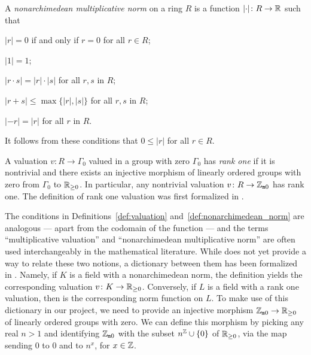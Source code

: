 \documentclass[sigplan,10pt, nonacm, review]{acmart}
\begin{document}
\begin{definition}\label{def:nonarchimedean_norm}
A \emph{nonarchimedean multiplicative norm} on a ring $R$ is a function $\lvert\cdot\rvert \colon R \to \mathbb{R}$
such that
\begin{listDef}
\item $\lvert r\rvert = 0$ if and only if $r = 0$ for all $r \in R$;
\item $\lvert 1\rvert = 1$;
\item $\lvert r\cdot s\rvert  = \lvert r\rvert \cdot \lvert s\rvert $ for all $r, s$ in $R$;
\item $\lvert r + s\rvert \leq \max \{\lvert r\rvert, \lvert s\rvert \}$ for all $r, s$ in $R$;
\item $\lvert -r\rvert = \lvert r\rvert$ for all $r$ in $R$.
\end{listDef}
It follows from these conditions that $0 \le \lvert r\rvert$ for all $r \in R$.
\end{definition}
A valuation $v \colon R \to \Gamma_0$ valued in a group with zero $\Gamma_0$ has \emph{rank one} if it is nontrivial and there exists an injective morphism of linearly ordered groups with zero from $\Gamma_0$ to $\mathbb{R}_{\ge 0}$. In particular, any nontrivial valuation $v \colon R \to \mathbb{Z}_{\mathtt{m}0}$ has rank one. The definition of rank one valuation was first formalized in \cite{deF23}\href{https://github.com/mariainesdff/norm_extensions_journal_submission/blob/d396130660935464fbc683f9aaf37fff8a890baa/src/rank_one_valuation.lean#L38}{\extlink}.

The conditions in Definitions~\ref{def:valuation} and~\ref{def:nonarchimedean_norm} are analogous --- apart from the codomain of the function --- and the terms ``multiplicative valuation'' and ``nonarchimedean multiplicative norm'' are often used interchangeably in the mathematical literature. While \mathlib does not yet provide a way to relate these two notions, a dictionary between them has been formalized in \cite{deF23}. Namely, if $K$ is a field with a nonarchimedean norm, the definition \href{https://github.com/mariainesdff/norm_extensions_journal_submission/blob/d396130660935464fbc683f9aaf37fff8a890baa/src/normed_valued.lean#L37}{\extlink} yields the corresponding valuation $v \colon K \rightarrow \mathbb{R}_{\ge 0}$. Conversely, if $L$ is a field with a rank one valuation, then \href{https://github.com/mariainesdff/norm_extensions_journal_submission/blob/d396130660935464fbc683f9aaf37fff8a890baa/src/normed_valued.lean#L110}{\extlink} is the corresponding norm function on $L$.
To  make use of this dictionary in our project, we need to provide an injective morphism $\mathbb{Z}_{\mathtt{m}0} \to \mathbb{R}_{\ge 0}$ of linearly ordered groups with zero. We can define this morphism by picking any real $n > 1$ and identifying $\mathbb{Z}_{\mathtt{m}0}$ with the subset $n^{\mathbb{Z}} \cup \{0\}$ of $\mathbb{R}_{\ge 0}$, via the map sending $0$ to $0$ and  to $n^x$, for $x \in \mathbb{Z}$.
\end{document}
